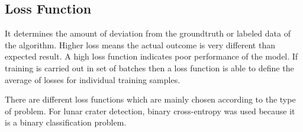 \documentclass[11pt]{article}
\begin{document}

\subsection{Loss Function}
It determines the amount of deviation from the groundtruth or labeled data of the algorithm. Higher loss means the actual outcome is very different than expected result. A high loss function indicates poor performance of the model. If training is carried out in set of batches then a loss function is able to define the average of losses for individual training samples. 

There are different loss functions which are mainly chosen according to the type of problem. For lunar crater detection, binary cross-entropy was used because it is a binary classification problem.
\end{document}
